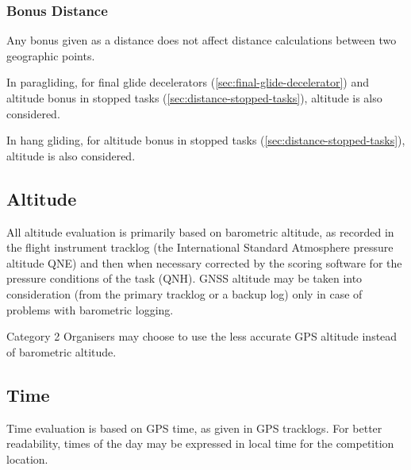\documentclass[gap.tex]{subfiles}
\begin{document}
\subsubsection{Bonus Distance}
Any bonus given as a distance does not affect distance calculations between two
geographic points.

\begin{pg}
In paragliding, for final glide decelerators (\ref{sec:final-glide-decelerator})
and altitude bonus in stopped tasks (\ref{sec:distance-stopped-tasks}), altitude
is also considered.
\end{pg}

\begin{hg}
In hang gliding, for altitude bonus in stopped tasks (\ref{sec:distance-stopped-tasks}),
altitude is also considered.
\end{hg}

\subsection{Altitude}
All altitude evaluation is primarily based on barometric altitude, as recorded
in the flight instrument tracklog (the International Standard Atmosphere
pressure altitude QNE) and then when necessary corrected by the scoring
software for the pressure conditions of the task (QNH). GNSS altitude may be
taken into consideration (from the primary tracklog or a backup log) only in
case of problems with barometric logging.

Category 2 Organisers may choose to use the less accurate GPS altitude instead
of barometric altitude.

\subsection{Time}
Time evaluation is based on GPS time, as given in GPS tracklogs. For better
readability, times of the day may be expressed in local time for the
competition location.
\end{document}
